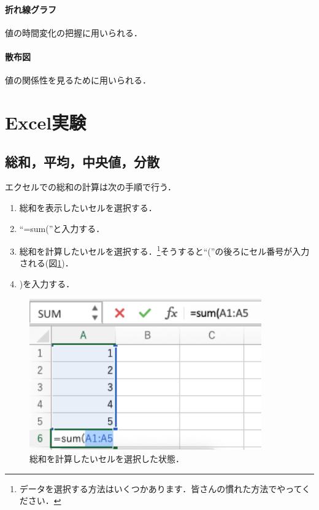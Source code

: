 \documentclass[12pt, a4j]{jreport}
\begin{document}
\paragraph{折れ線グラフ}

値の時間変化の把握に用いられる．


\paragraph{散布図}

値の関係性を見るために用いられる．


\section{Excel実験}

\subsection{総和，平均，中央値，分散}

エクセルでの総和の計算は次の手順で行う．

\begin{enumerate}
    \item 総和を表示したいセルを選択する．
    \item ``=sum(''と入力する．
    \item 総和を計算したいセルを選択する．\footnote{データを選択する方法はいくつかあります．皆さんの慣れた方法でやってください．}そうすると``(''の後ろにセル番号が入力される(図\ref{fig:sum})．
    \item )を入力する．
\end{enumerate}

\begin{figure}[htbp]
  \includegraphics[width=10cm]{sum.png}
  \caption{総和を計算したいセルを選択した状態．}
  \label{fig:sum}
\end{figure}
\end{document}
